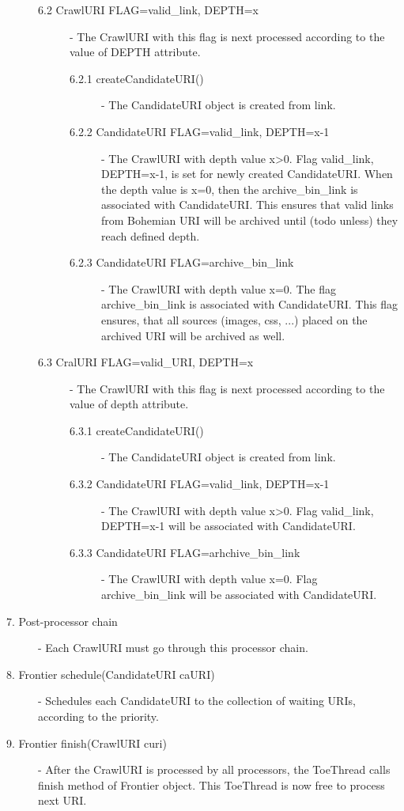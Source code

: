 \documentclass[11pt,a4paper]{article}
\begin{document}
\begin{description}
\begin{description}
\item[6.2 CrawlURI FLAG=valid\_link, DEPTH=x] - The CrawlURI with this flag is next processed according to the value of DEPTH attribute.

\begin{description}
\item[6.2.1 createCandidateURI()] - The CandidateURI object is created from link.
\item[6.2.2 CandidateURI FLAG=valid\_link, DEPTH=x-1] - The CrawlURI with depth value x>0. Flag valid\_link, DEPTH=x-1, is set for newly created CandidateURI. When the depth value is x=0, then the archive\_bin\_link is associated with CandidateURI. This ensures that valid links from Bohemian URI will be archived until (todo unless) they reach defined depth.
\item[6.2.3 CandidateURI FLAG=archive\_bin\_link] - The CrawlURI with depth value x=0. The flag archive\_bin\_link is associated with CandidateURI. This flag ensures, that all sources (images, css, ...) placed on the archived URI will be archived as well.
\end{description}


\item[6.3 CralURI FLAG=valid\_URI, DEPTH=x] - The CrawlURI with this flag is next processed according to the value of depth attribute.

\begin{description}
\item[6.3.1 createCandidateURI()] - The CandidateURI object is created from link.
\item[6.3.2 CandidateURI FLAG=valid\_link, DEPTH=x-1] - The CrawlURI with depth value x>0. Flag valid\_link, DEPTH=x-1 will be associated with CandidateURI.
\item[6.3.3 CandidateURI FLAG=arhchive\_bin\_link] - The CrawlURI with depth value x=0. Flag archive\_bin\_link will be associated with CandidateURI.
\end{description}
\end{description}

\item[7. Post-processor chain] - Each CrawlURI must go through this processor chain.
\item[8. Frontier schedule(CandidateURI caURI)] - Schedules each CandidateURI to the collection of waiting URIs, according to the priority.
\item[9. Frontier finish(CrawlURI curi)] - After the CrawlURI is processed by all processors, the ToeThread calls finish method of Frontier object. This ToeThread is now free to process next URI.

\end{description}
\end{document}
